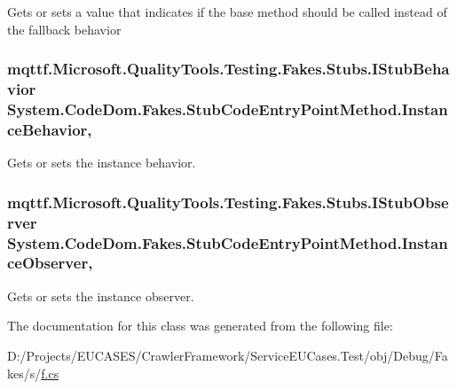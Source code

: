 Gets or sets a value that indicates if the base method should be called instead of the fallback behavior

\hypertarget{class_system_1_1_code_dom_1_1_fakes_1_1_stub_code_entry_point_method_a722fcdb9e8a633e12b6da2f46e4a9cc7}{
\subsubsection[{Instance\-Behavior}]{\setlength{\rightskip}{0pt plus 5cm}mqttf.\-Microsoft.\-Quality\-Tools.\-Testing.\-Fakes.\-Stubs.\-I\-Stub\-Behavior System.\-Code\-Dom.\-Fakes.\-Stub\-Code\-Entry\-Point\-Method.\-Instance\-Behavior\hspace{0.3cm}{\ttfamily [get]}, {\ttfamily [set]}}}\label{class_system_1_1_code_dom_1_1_fakes_1_1_stub_code_entry_point_method_a722fcdb9e8a633e12b6da2f46e4a9cc7}


Gets or sets the instance behavior.

\hypertarget{class_system_1_1_code_dom_1_1_fakes_1_1_stub_code_entry_point_method_ab84925a607070db134c9390d0565b5cb}{
\subsubsection[{Instance\-Observer}]{\setlength{\rightskip}{0pt plus 5cm}mqttf.\-Microsoft.\-Quality\-Tools.\-Testing.\-Fakes.\-Stubs.\-I\-Stub\-Observer System.\-Code\-Dom.\-Fakes.\-Stub\-Code\-Entry\-Point\-Method.\-Instance\-Observer\hspace{0.3cm}{\ttfamily [get]}, {\ttfamily [set]}}}\label{class_system_1_1_code_dom_1_1_fakes_1_1_stub_code_entry_point_method_ab84925a607070db134c9390d0565b5cb}


Gets or sets the instance observer.



The documentation for this class was generated from the following file\-:\begin{DoxyCompactItemize}
\item 
D\-:/\-Projects/\-E\-U\-C\-A\-S\-E\-S/\-Crawler\-Framework/\-Service\-E\-U\-Cases.\-Test/obj/\-Debug/\-Fakes/s/\hyperlink{s_2f_8cs}{f.\-cs}\end{DoxyCompactItemize}
